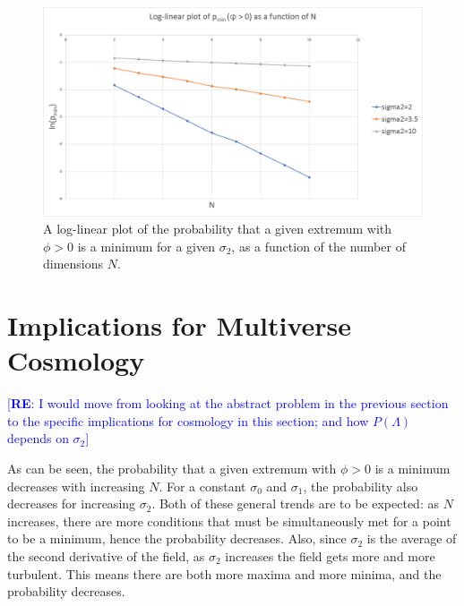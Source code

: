 \documentclass[12pt]{article}
\newcommand{\re}[1]{\textcolor{blue}{[{\bf RE}: #1]}}
\begin{document}
\begin{figure} 
  \centering
  \includegraphics[width=\linewidth]{Log-linear.png}
  \caption{A log-linear plot of the probability that a given extremum with $\phi > 0$ is a minimum for a given $\sigma_2$, as a function of the number of dimensions $N$.}
  \label{Log-Linear}
\end{figure}

\section{Implications for Multiverse Cosmology}

\re{I would move from looking at the abstract problem in the previous section to the specific implications for cosmology in this section; and how $P(\Lambda)$ depends on $\sigma_2$}

As can be seen, the probability that a given extremum with $\phi > 0$ is a minimum decreases with increasing $N$. For a constant $\sigma_0$ and $\sigma_1$, the probability also decreases for increasing $\sigma_2$. Both of these general trends are to be expected: as $N$ increases, there are more conditions that must be simultaneously met for a point to be a minimum, hence the probability decreases. Also, since $\sigma_2$ is the average of the second derivative of the field, as $\sigma_2$ increases the field gets more and more turbulent. This means there are both more maxima and more minima, and the probability decreases.
\end{document}
